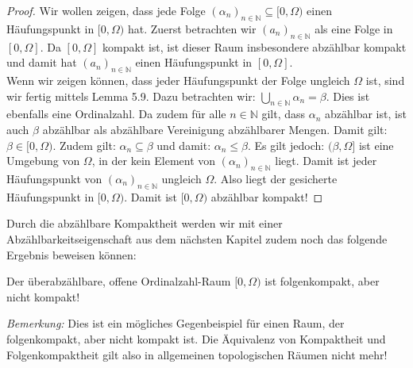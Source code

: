 \documentclass[11pt]{scrartcl}
\begin{document}
\begin{proof}
	Wir wollen zeigen, dass jede Folge $(\alpha_n)_{n\in\mathbb N} \subseteq [0,\Omega)$ einen 
	Häufungspunkt in $[0,\Omega)$ hat. Zuerst betrachten wir $(a_n)_{n\in\mathbb N}$ als eine Folge
	in $[0,\Omega]$. Da $[0,\Omega]$ kompakt ist, ist dieser Raum insbesondere abzählbar kompakt und
	damit hat $(a_n)_{n\in\mathbb N}$ einen Häufungspunkt in $[0,\Omega]$.\\
	Wenn wir zeigen können, dass jeder Häufungspunkt der Folge ungleich $\Omega$ ist, sind wir
	fertig mittels Lemma 5.9. Dazu betrachten wir: $\bigcup_{n\in\mathbb N} \alpha_n = \beta$. Dies
	ist ebenfalls eine Ordinalzahl. Da zudem für alle $n\in\mathbb N$ gilt, dass $\alpha_n$ 
	abzählbar ist, ist auch $\beta$ abzählbar als abzählbare Vereinigung abzählbarer Mengen. Damit 
	gilt: $\beta \in [0, \Omega)$. Zudem gilt: $\alpha_n \subseteq \beta$ und damit: $\alpha_n\leq 
	\beta$. Es gilt jedoch: $(\beta,\Omega]$ ist eine Umgebung von $\Omega$, in der kein Element von 
	$(\alpha_n)_{n\in\mathbb N}$ liegt. Damit ist jeder Häufungspunkt von $(\alpha_n)_{n\in\mathbb N}
	$ ungleich $\Omega$. Also liegt der gesicherte Häufungspunkt in $[0,\Omega)$. Damit ist
	$[0,\Omega)$ abzählbar kompakt!
\end{proof}
\noindent Durch die abzählbare Kompaktheit werden wir mit einer Abzählbarkeitseigenschaft aus dem nächsten Kapitel zudem noch das folgende Ergebnis beweisen können:
\begin{theorem}
	Der überabzählbare, offene Ordinalzahl-Raum $[0,\Omega)$ ist folgenkompakt, aber nicht kompakt!
\end{theorem}
\textit{Bemerkung:} Dies ist ein mögliches Gegenbeispiel für einen Raum, der folgenkompakt, aber nicht kompakt ist. Die Äquivalenz von Kompaktheit und Folgenkompaktheit gilt also in allgemeinen topologischen Räumen nicht mehr!
\end{document}
